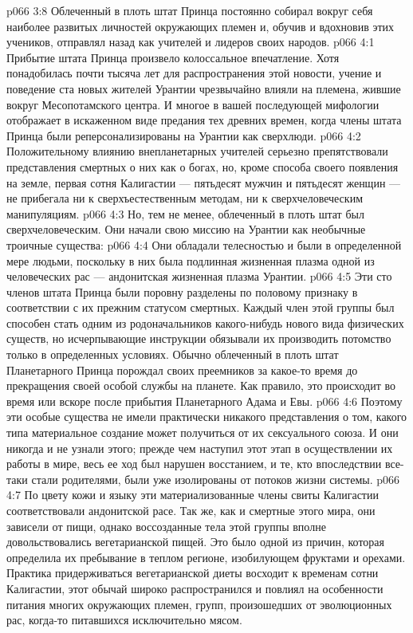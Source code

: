 \vs p066 3:8 Облеченный в плоть штат Принца постоянно собирал вокруг себя наиболее развитых личностей окружающих племен и, обучив и вдохновив этих учеников, отправлял назад как учителей и лидеров своих народов.
\vs p066 4:1 Прибытие штата Принца произвело колоссальное впечатление. Хотя понадобилась почти тысяча лет для распространения этой новости, учение и поведение ста новых жителей Урантии чрезвычайно влияли на племена, жившие вокруг Месопотамского центра. И многое в вашей последующей мифологии отображает в искаженном виде предания тех древних времен, когда члены штата Принца были реперсонализированы на Урантии как сверхлюди.
\vs p066 4:2 Положительному влиянию внепланетарных учителей серьезно препятствовали представления смертных о них как о богах, но, кроме способа своего появления на земле, первая сотня Калигастии --- пятьдесят мужчин и пятьдесят женщин --- не прибегала ни к сверхъестественным методам, ни к сверхчеловеческим манипуляциям.
\vs p066 4:3 Но, тем не менее, облеченный в плоть штат был сверхчеловеческим. Они начали свою миссию на Урантии как необычные троичные существа:
\vs p066 4:4 \pc {}\bibnobreakspace Они обладали телесностью и были в определенной мере людьми, поскольку в них была подлинная жизненная плазма одной из человеческих рас --- андонитская жизненная плазма Урантии.
\vs p066 4:5 Эти сто членов штата Принца были поровну разделены по половому признаку в соответствии с их прежним статусом смертных. Каждый член этой группы был способен стать одним из родоначальников какого\hyp{}нибудь нового вида физических существ, но исчерпывающие инструкции обязывали их производить потомство только в определенных условиях. Обычно облеченный в плоть штат Планетарного Принца порождал своих преемников за какое\hyp{}то время до прекращения своей особой службы на планете. Как правило, это происходит во время или вскоре после прибытия Планетарного Адама и Евы.
\vs p066 4:6 Поэтому эти особые существа не имели практически никакого представления о том, какого типа материальное создание может получиться от их сексуального союза. И они никогда и не узнали этого; прежде чем наступил этот этап в осуществлении их работы в мире, весь ее ход был нарушен восстанием, и те, кто впоследствии все\hyp{}таки стали родителями, были уже изолированы от потоков жизни системы.
\vs p066 4:7 По цвету кожи и языку эти материализованные члены свиты Калигастии соответствовали андонитской расе. Так же, как и смертные этого мира, они зависели от пищи, однако воссозданные тела этой группы вполне довольствовались вегетарианской пищей. Это было одной из причин, которая определила их пребывание в теплом регионе, изобилующем фруктами и орехами. Практика придерживаться вегетарианской диеты восходит к временам сотни Калигастии, этот обычай широко распространился и повлиял на особенности питания многих окружающих племен, групп, произошедших от эволюционных рас, когда\hyp{}то питавшихся исключительно мясом.
